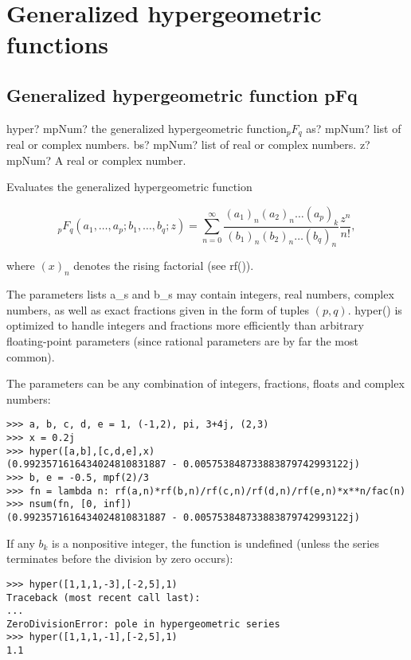 \newpage
\section{Generalized hypergeometric functions}

\subsection{Generalized hypergeometric function pFq}

\begin{mpFunctionsExtract}
	\mpFunctionThree
	{hyper? mpNum? the generalized hypergeometric function${}_pF_q$}
	{as? mpNum? list of real or complex numbers.}
	{bs? mpNum? list of real or complex numbers.}
	{z? mpNum? A real or complex number.}		
\end{mpFunctionsExtract}

\vpara
Evaluates the generalized hypergeometric function

\begin{equation}
{}_pF_q(a_1,\ldots,a_p;b_1,\ldots,b_q;z) = \sum_{n=0}^{\infty} \frac{(a_1)_n (a_2)_n \ldots (a_p)_k}{(b_1)_n (b_2)_n \ldots (b_q)_n} \frac{z^n}{n!},
\end{equation}


where $(x)_n$ denotes the rising factorial (see rf()).

The parameters lists a\_s and b\_s may contain integers, real numbers, complex numbers, as well as exact fractions given in the form of tuples $(p,q)$. hyper() is optimized to handle integers and fractions more efficiently than arbitrary floating-point parameters (since rational parameters are by far the most common).

The parameters can be any combination of integers, fractions, floats and complex numbers:

\begin{lstlisting}
>>> a, b, c, d, e = 1, (-1,2), pi, 3+4j, (2,3)
>>> x = 0.2j
>>> hyper([a,b],[c,d,e],x)
(0.9923571616434024810831887 - 0.005753848733883879742993122j)
>>> b, e = -0.5, mpf(2)/3
>>> fn = lambda n: rf(a,n)*rf(b,n)/rf(c,n)/rf(d,n)/rf(e,n)*x**n/fac(n)
>>> nsum(fn, [0, inf])
(0.9923571616434024810831887 - 0.005753848733883879742993122j)
\end{lstlisting}

If any $b_k$ is a nonpositive integer, the function is undefined (unless the series terminates before the division by zero occurs):

\begin{lstlisting}
>>> hyper([1,1,1,-3],[-2,5],1)
Traceback (most recent call last):
...
ZeroDivisionError: pole in hypergeometric series
>>> hyper([1,1,1,-1],[-2,5],1)
1.1
\end{lstlisting}



